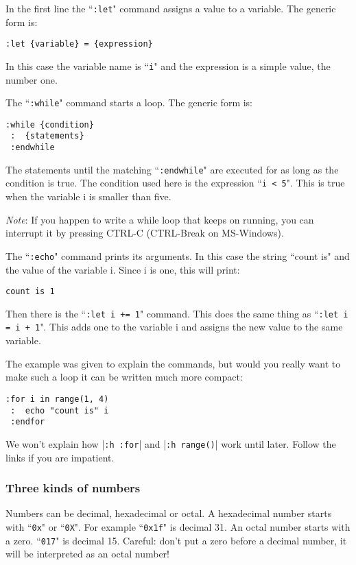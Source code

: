 In the first line the ``\texttt{:let}" command assigns a value to a variable.
The generic form is:

\begin{Verbatim}[samepage=true]
 :let {variable} = {expression}
\end{Verbatim}

In this case the variable name is ``\texttt{i}" and the expression is a simple value, the number one.

The ``\texttt{:while}" command starts a loop.
The generic form is:

\begin{Verbatim}[samepage=true]
 :while {condition}
 :  {statements}
 :endwhile
\end{Verbatim}

The statements until the matching ``\texttt{:endwhile}" are executed for as long as the condition is true.
The condition used here is the expression ``\texttt{i < 5}".
This is true when the variable i is smaller than five.

\emph{Note}: If you happen to write a while loop that keeps on running, you can interrupt it by pressing CTRL-C (CTRL-Break on MS-Windows).

The ``\texttt{:echo}" command prints its arguments.
In this case the string ``count is" and the value of the variable i.
Since i is one, this will print:

\begin{Verbatim}[samepage=true]
    count is 1
\end{Verbatim}

Then there is the ``\texttt{:let i += 1}" command.
This does the same thing as ``\texttt{:let i = i + 1}".
This adds one to the variable i and assigns the new value to the same variable.

The example was given to explain the commands, but would you really want to make such a loop it can be written much more compact:

\begin{Verbatim}[samepage=true]
 :for i in range(1, 4)
 :  echo "count is" i
 :endfor
\end{Verbatim}

We won't explain how |\texttt{:h :for}| and |\texttt{:h range()}| work until later.
Follow the links if you are impatient.

\subsubsection{Three kinds of numbers}
Numbers can be decimal, hexadecimal or octal.
A hexadecimal number starts with ``\texttt{0x}" or ``\texttt{0X}".
For example ``\texttt{0x1f}" is decimal 31.
An octal number starts with a zero.
``\texttt{017}" is decimal 15.
Careful: don't put a zero before a decimal number, it will be interpreted as an octal number!

